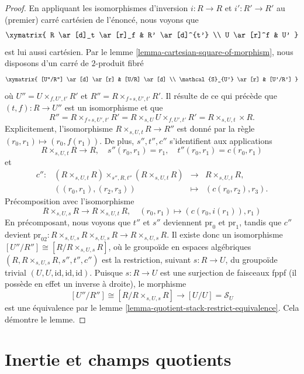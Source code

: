 \begin{proof}
En appliquant les isomorphismes d'inversion $i : R \to R$ et
$i' : R' \to R'$ au (premier) carré cartésien de l'énoncé, nous voyons que
$$
\xymatrix{
R \ar[d]_t \ar[r]_f & R' \ar[d]^{t'} \\
U \ar[r]^f & U'
}
$$
est lui aussi cartésien. Par le lemme
\ref{lemma-cartesian-square-of-morphism}, nous disposons d'un carré de
$2$-produit fibré
$$
\xymatrix{
[U''/R''] \ar[d] \ar[r] & [U/R] \ar[d] \\
\mathcal{S}_{U'} \ar[r] & [U'/R']
}
$$
où $U'' = U \times_{f, U', t'} R'$ et
$R'' = R \times_{f \circ s, U', t'} R'$. Il résulte de ce qui précède que
$(t, f) : R \to U''$ est un isomorphisme et que
$$
R'' =
R \times_{f \circ s, U', t'} R' =
R \times_{s, U} U \times_{f, U', t'} R' =
R \times_{s, U, t} \times R.
$$
Explicitement, l'isomorphisme $R \times_{s, U, t} R \to R''$ est donné par
la règle $(r_0, r_1) \mapsto (r_0, f(r_1))$. De plus, $s'', t'', c''$
s'identifient aux applications
$$
R \times_{s, U, t} R \to R,
\quad
s''(r_0, r_1) = r_1, \quad t''(r_0, r_1) = c(r_0, r_1)
$$
et
$$
\begin{matrix}
c'' : &
(R \times_{s, U, t} R) \times_{s'', R, t''} (R \times_{s, U, t} R)
&
\longrightarrow
&
R \times_{s, U, t} R, \\
&
((r_0, r_1), (r_2, r_3)) &
\longmapsto & (c(r_0, r_2), r_3).
\end{matrix}
$$
Précomposition avec l'isomorphisme
$$
R \times_{s, U, s} R \longrightarrow R \times_{s, U, t} R,
\quad
(r_0, r_1) \longmapsto (c(r_0, i(r_1)), r_1)
$$
En précomposant, nous voyons que $t''$ et $s''$ deviennent
$\text{pr}_0$ et $\text{pr}_1$, tandis que $c''$ devient
$\text{pr}_{02} : R \times_{s, U, s} R \times_{s, U, s} R \to R \times_{s, U, s} R$.
Il existe donc un isomorphisme
$[U''/R''] \cong [R/R \times_{s, U, s} R]$, où le groupoïde en espaces
algébriques $(R, R \times_{s, U, s} R, s'', t'', c'')$ est la restriction,
suivant $s : R \to U$, du groupoïde trivial
$(U, U, \text{id}, \text{id}, \text{id})$. Puisque $s : R \to U$ est une
surjection de faisceaux fppf (il possède en effet un inverse à droite), le
morphisme
$$
[U''/R''] \cong [R/R \times_{s, U, s} R]
\longrightarrow
[U/U] = \mathcal{S}_U
$$
est une équivalence par le lemme
\ref{lemma-quotient-stack-restrict-equivalence}. Cela démontre le lemme.
\end{proof}





\section{Inertie et champs quotients}
\label{section-inertia}

